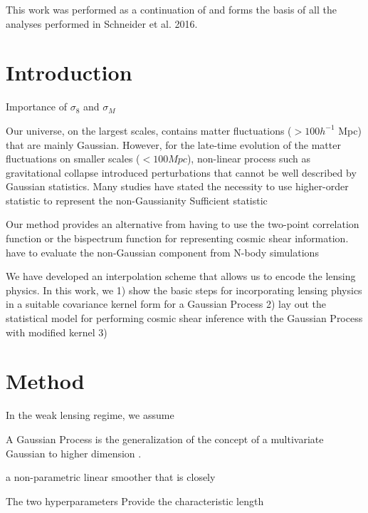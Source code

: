 
This work was performed as a continuation of \citep{Schneider2014}  
and forms the basis of all the analyses performed in Schneider et al. 2016.

\section{Introduction} 

Importance of $\sigma_8$ and $\sigma_M$  


Our universe, on the largest scales, contains matter fluctuations ($> 100
h^{-1}$ Mpc) that are
mainly Gaussian. 
However, for the late-time evolution of the matter fluctuations on smaller
scales ($< 100 Mpc$), non-linear process such as gravitational collapse introduced  
perturbations that cannot be well described by Gaussian statistics.   
Many studies have stated the necessity to use higher-order statistic to represent the
non-Gaussianity \cite{Jee} 
Sufficient statistic 

Our method provides an alternative from having to use the two-point correlation 
function or the bispectrum function for representing cosmic shear information. 
have to evaluate the non-Gaussian component from N-body simulations  

We have developed an interpolation scheme that allows us to encode the 
lensing physics.  
In this work, we 
1) show the basic steps for incorporating lensing physics in 
a suitable covariance kernel form for a Gaussian Process  
2) lay out the statistical model for performing cosmic shear inference 
with the Gaussian Process with modified kernel 
3)  

\section{Method}

In the weak lensing regime, we assume  


A Gaussian Process is the generalization of the concept of a multivariate Gaussian
to higher dimension \citep{Rasmussen2006}. 

a non-parametric linear smoother \cite{Hastie1990} that is closely   



The two hyperparameters Provide the characteristic length  

